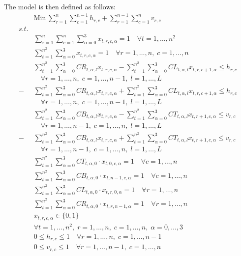 \documentclass[preprint,12pt]{elsarticle}
\begin{document}
{\noindent
The model is then defined as follows:
\begin{align}
& \textrm{Min}\ \sum_{r=1}^{n} \sum_{c=1}^{n-1} h_{r,c} + \sum_{r=1}^{n-1} \sum_{c=1}^{n} v_{r,c}\label{eq:m2obj}\\
s.t. & \nonumber\\
&\sum_{r=1}^n \sum_{c=1}^n \sum_{\alpha=0}^3 x_{t,r,c,\alpha}    = 1  \quad \forall t = 1, \ldots, n^2\label{eq:m1eachTileAssigned}\\
&\sum_{t=1}^{n^2}\sum_{\alpha=0}^3 x_{t,r,c,\alpha} = 1\quad\forall r=1,\ldots, n,\;c=1,\ldots, n \label{eq:m1oneTilePerPos}\\
&\sum_{t=1}^{n^2}{\sum_{\alpha=0}^3{CR_{t,\alpha,l} x_{t,r,c,\alpha}} } - \sum_{t=1}^{n^2}{\sum_{\alpha=0}^3{CL_{t,\alpha,l} x_{t,r,c+1,\alpha}} } \leq h_{r,c}\nonumber\\
&\quad\forall r=1,\ldots,n,\;c=1,\ldots ,n-1,\;l=1,\ldots ,L\label{eq:m2horizontalEdge1}\\
-&\sum_{t=1}^{n^2}{\sum_{\alpha=0}^3{CR_{t,\alpha,l} x_{t,r,c,\alpha}} } + \sum_{t=1}^{n^2}{\sum_{\alpha=0}^3{CL_{t,\alpha,l} x_{t,r,c+1,\alpha}} } \leq h_{r,c}\nonumber\\
&\quad\forall r=1,\ldots,n,\; c=1,\ldots ,n-1,\;l=1,\ldots ,L\label{eq:m2horizontalEdge2}\\
&\sum_{t=1}^{n^2}{\sum_{\alpha=0}^3{CB_{t,\alpha,l} x_{t,r,c,\alpha}} } - \sum_{t=1}^{n^2}{\sum_{\alpha=0}^3{CT_{t,\alpha,l} x_{t,r+1,c,\alpha}} } \leq v_{r,c}\nonumber\\
&\quad\forall r=1,\ldots,n-1,\;c=1,\ldots ,n,\;l=1,\ldots , L\label{eq:m2verticalEdge1}\\
-&\sum_{t=1}^{n^2}{\sum_{\alpha=0}^3{CB_{t,\alpha,l} x_{t,r,c,\alpha}} } + \sum_{t=1}^{n^2}{\sum_{\alpha=0}^3{CT_{t,\alpha,l} x_{t,r+1,c,\alpha}} } \leq v_{r,c}\nonumber\\
&\quad\forall r=1,\ldots,n-1,\;c=1,\ldots ,n,\;l=1,\ldots ,L\label{eq:m2verticalEdge2}\\
&\sum_{t=1}^{n^2}{\sum_{\alpha=0}^3{CT_{t,\alpha,0}\cdot x_{t,0,c,\alpha}} } = 1\quad\forall c=1,\ldots, n\label{eq:m1topGray}\\
&\sum_{t=1}^{n^2}{\sum_{\alpha=0}^3{CB_{t,\alpha,0}\cdot x_{t,n-1,c,\alpha}} } = 1\quad\forall c=1,\ldots, n\label{eq:m1bottomGray}\\
&\sum_{t=1}^{n^2}{\sum_{\alpha=0}^3{CL_{t,\alpha,0}\cdot x_{t,r,0,\alpha}} } = 1\quad\forall r=1,\ldots, n\label{eq:m1leftGray}\\
&\sum_{t=1}^{n^2}{\sum_{\alpha=0}^3{CR_{t,\alpha,0}\cdot x_{t,r,n-1,\alpha}} } = 1\quad\forall r=1,\ldots, n\label{eq:m1rightGray}\\
&x_{t,r,c,\alpha} \in \{0,1\}\nonumber\\
&\forall t= 1,\ldots, n^2, \;r=1,\ldots, n, \;c=1,\ldots, n,\;\alpha = 0,\ldots, 3\label{eq:m2xvars}\\
&0\leq h_{r,c} \leq 1\quad \forall r=1,\ldots, n, \;c=1,\ldots,n-1\label{eq:varh}\\
&0\leq v_{r,c} \leq 1\quad \forall r=1,\ldots, n-1, \;c=1,\ldots,n\label{eq:varv}
 \end{align}

}
\end{document}

